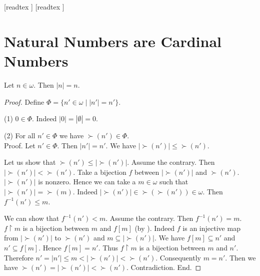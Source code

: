 \documentclass[10pt]{article}
\begin{document}
  \begin{imports}
    \begin{forthel}
      [readtex ]
      [readtex ]
    \end{forthel}
  \end{imports}


  \section*{Natural Numbers are Cardinal Numbers}

  \begin{forthel}
    \begin{theorem}
      Let $n \in \omega$.
      Then $|n| = n$.
    \end{theorem}
    \begin{proof}
      Define $\Phi = \{ n' \in \omega \mid |n'| = n' \}$.

      (1) $0 \in \Phi$.
      Indeed $|0| = |\emptyset| = 0$.

      (2) For all $n' \in \Phi$ we have $\succ(n') \in \Phi$. \\
      Proof.
        Let $n' \in \Phi$.
        Then $|n'| = n'$.
        We have $|\succ(n')| \leq \succ(n')$.

        Let us show that $\succ(n') \leq |\succ(n')|$.
          Assume the contrary.
          Then $|\succ(n')| < \succ(n')$.
          Take a bijection $f$ between $|\succ(n')|$ and $\succ(n')$.
          $|\succ(n')|$ is nonzero.
          Hence we can take a $m \in \omega$ such that $|\succ(n')| = \succ(m)$.
          Indeed $|\succ(n')| \in \succ(\succ(n')) \in \omega$.
          Then $f^{-1}(n') \leq m$.

          We can show that $f^{-1}(n') < m$.
            Assume the contrary.
            Then $f^{-1}(n') = m$.
            $f \restriction m$ is a bijection between $m$ and $f[m]$ (by ).
            Indeed $f$ is an injective map from $|\succ(n')|$ to $\succ(n')$ and
            $m \subseteq |\succ(n')|$.
            We have $f[m] \subseteq n'$ and $n' \subseteq f[m]$.
            Hence $f[m] = n'$.
            Thus $f \restriction m$ is a bijection between $m$ and $n'$.
            Therefore $n'
              = |n'|
              \leq m
              < |\succ(n')|
              < \succ(n')$.
            Consequently $m = n'$.
            Then we have $\succ(n') = |\succ(n')| < \succ(n')$.
            Contradiction.
          End.


\end{proof}
\end{forthel}
\end{document}
